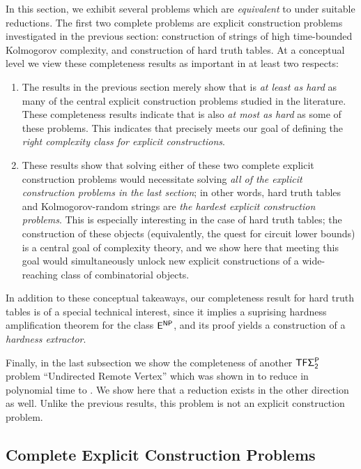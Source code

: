 In this section, we exhibit several problems which are \emph{equivalent} to \avoid under suitable reductions. The first two complete problems are explicit construction problems investigated in the previous section: construction of strings of high time-bounded Kolmogorov complexity, and construction of hard truth tables. At a conceptual level we view these completeness results as important in at least two respects:
\begin{enumerate}
    \item The results in the previous section merely show that \avoid is \emph{at least as hard} as many of the central explicit construction problems studied in the literature. These completeness results indicate that \avoid is also \emph{at most as hard} as some of these problems. This indicates that \avoid precisely meets our goal  of defining the \emph{right complexity class for explicit constructions}.
    \item These results show that solving either of these two complete explicit construction problems would necessitate solving \emph{all of the explicit construction problems in the last section}; in other words, hard truth tables and Kolmogorov-random strings are \emph{the hardest explicit construction problems}. This is especially interesting in the case of hard truth tables; the construction of these objects (equivalently, the quest for circuit lower bounds) is a central goal of complexity theory, and we show here that meeting this goal would simultaneously unlock new explicit constructions of a wide-reaching class of combinatorial objects.
\end{enumerate}

In addition to these conceptual takeaways, our completeness result for hard truth tables is of a special technical interest, since it implies a suprising hardness amplification theorem for the class $\cl{E^{NP}}$, and its proof yields a construction of a \emph{hardness extractor}.

Finally, in the last subsection we show the completeness of another $\cl{TF\Sigma_2^P}$ problem ``{\sc Undirected Remote Vertex}'' which was shown in \cite{KKMP21} to reduce in polynomial time to \avoid. We show here that a reduction exists in the other direction as well. Unlike the previous results, this problem is not an explicit construction problem.

\subsection{Complete Explicit Construction Problems}

